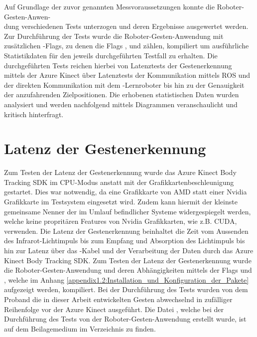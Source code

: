 Auf Grundlage der zuvor genannten Messvoraussetzungen konnte die Roboter-Gesten-Anwen-\\dung verschiedenen Tests unterzogen und deren Ergebnisse ausgewertet werden. Zur Durchführung der Tests wurde die Roboter-Gesten-Anwendung mit zusätzlichen -Flags, zu denen die Flags ,  und  zählen, kompiliert um ausführliche Statistikdaten für den jeweils durchgeführten Testfall zu erhalten. Die durchgeführten Tests reichen hierbei von Latenztests der Gestenerkennung mittels der Azure Kinect über Latenztests der Kommunikation mittels ROS und der direkten Kommunikation mit dem -Lernroboter bis hin zu der Genauigkeit der anzufahrenden Zielpositionen. Die erhobenen statistischen Daten wurden analysiert und werden nachfolgend mittels Diagrammen veranschaulicht und kritisch hinterfragt.

\section{Latenz der Gestenerkennung}
Zum Testen der Latenz der Gestenerkennung wurde das Azure Kinect Body Tracking SDK im CPU-Modus anstatt mit der Grafikkartenbeschleunigung gestartet. Dies war notwendig, da eine Grafikkarte von AMD statt einer Nvidia Grafikkarte im Testsystem eingesetzt wird. Zudem kann hiermit der kleinste gemeinsame Nenner der im Umlauf befindlicher Systeme widergespiegelt werden, welche keine propritären Features von Nvidia Grafikkarten, wie z.B. CUDA, verwenden. Die Latenz der Gestenerkennung beinhaltet die Zeit vom Aussenden des Infrarot-Lichtimpuls bis zum Empfang und Absorption des Lichtimpuls bis hin zur Latenz über das -Kabel und der Verarbeitung der Daten durch das Azure Kinect Body Tracking SDK. Zum Testen der Latenz der Gestenerkennung wurde die Roboter-Gesten-Anwendung und deren Abhängigkeiten mittels der Flags  und , welche im Anhang \ref{appendix1.2:Installation_und_Konfiguration_der_Pakete} aufgezeigt werden, kompiliert. Bei der Durchführung des Tests wurden von dem Proband die in dieser Arbeit entwickelten Gesten abwechselnd in zufälliger Reihenfolge vor der Azure Kinect ausgeführt. Die Datei , welche bei der Durchführung des Tests von der Roboter-Gesten-Anwendung erstellt wurde, ist auf dem Beilagemedium im Verzeichnis  zu finden.

